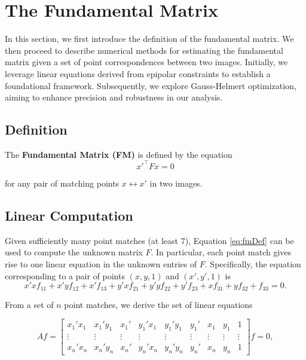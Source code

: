 \section{The Fundamental Matrix}\label{sec:fm}
In this section, we first introduce the definition of the fundamental matrix. We then proceed to describe numerical methods for estimating the fundamental matrix given a set of point correspondences between two images. Initially, we leverage linear equations derived from epipolar constraints to establish a foundational framework. Subsequently, we explore Gauss-Helmert optimization, aiming to enhance precision and robustness in our analysis.

\subsection{Definition}
The \textbf{Fundamental Matrix (FM)} is defined by the equation
\begin{equation}
	x'^\top Fx = 0
	\label{eq:fmDef}
\end{equation}

for any pair of matching points \( x \leftrightarrow x' \) in two images. 

\subsection{Linear Computation}
Given sufficiently many point matches (\ie at least 7), Equation \ref{eq:fmDef} can be used to compute the unknown matrix \( F \). In particular, each point match gives rise to one linear equation in the unknown entries of \( F \). Specifically, the equation corresponding to a pair of points \( (x, y, 1) \) and \( (x', y', 1) \) is
\begin{equation}
	x'xf_{11} + x'yf_{12} + x'f_{13} + y'xf_{21} + y'yf_{22} + y'f_{23} + xf_{31} + yf_{32} + f_{33} = 0.
\end{equation}

From a set of \( n \) point matches, we derive the set of linear equations

\begin{equation}
	Af = 
	\begin{bmatrix}
	x_1'x_1 & x_1'y_1 & x_1' & y_1'x_1 & y_1'y_1 & y_1' & x_1 & y_1 & 1\\
	\vdots & \vdots & \vdots & \vdots & \vdots & \vdots & \vdots & \vdots & \vdots\\
	x_n'x_n & x_n'y_n & x_n' & y_n'x_n & y_n'y_n & y_n' & x_n & y_n & 1
	\end{bmatrix}
	f = 0,
	\label{eq:LinearFM}
\end{equation}


